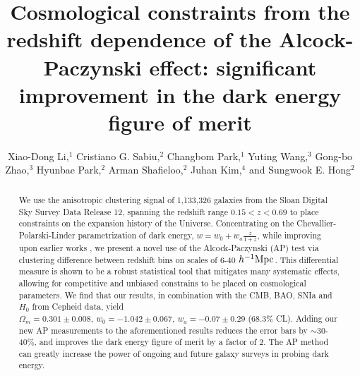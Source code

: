\documentclass[prl,twocolumn,superscriptaddress,aps,amsmath,amssymb,nofootinbib,altaffilletter]{revtex4}
\begin{document}
\title{Cosmological constraints from the redshift dependence of the Alcock-Paczynski effect: 
significant improvement in the dark energy figure of merit}

\author{ 
Xiao-Dong Li,$^{1}$
Cristiano G. Sabiu,$^{2}$
Changbom Park,$^{1}$
Yuting Wang,$^{3}$
Gong-bo Zhao,$^{3}$
Hyunbae Park,$^{2}$
Arman Shafieloo,$^{2}$
Juhan Kim,$^{4}$
and Sungwook E. Hong$^{2}$}


\begin{abstract}
We use the anisotropic clustering signal of 1,133,326 galaxies from the Sloan Digital Sky Survey Data Release 
12, spanning the redshift range $0.15<z<0.69$ to place constraints on the expansion history of the Universe. 
Concentrating on the Chevallier-Polarski-Linder parametrization of dark energy, $w=w_0+w_a\frac{z}{1+z}$,
while improving upon earlier works \citep{Li2016}, 
we present a novel use of the Alcock-Paczynski (AP) test via clustering difference between redshift bins on scales of 6-40 $h^{-1}\rm Mpc$.
This differential measure is shown to be a robust statistical tool that mitigates many systematic effects, 
allowing for competitive and unbiased constrains to be placed on cosmological parameters.
We find that our results, in combination with the CMB, BAO, SNIa and $H_0$ from Cepheid data, yield
$\Omega_m = 0.301 \pm 0.008,\ w_0 = -1.042 \pm 0.067,\ w_a = -0.07 \pm 0.29$ (68.3\% CL). 
Adding our new AP measurements to the aforementioned results 
reduces the error bars by $\sim$30-40\%,
and improves the dark energy figure of merit by a factor of 2. 
The AP method can %
greatly increase the power of ongoing and future galaxy surveys in probing dark energy.
\end{abstract}

\maketitle
\end{document}
